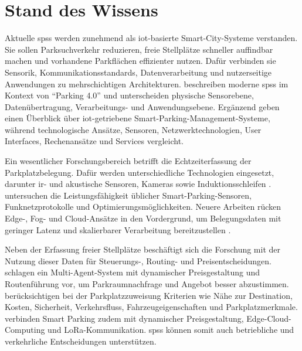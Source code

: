 
\section{Stand des Wissens}\label{sec:related_work}

Aktuelle \acp{sps} werden zunehmend als \ac{iot}-basierte Smart-City-Systeme verstanden. Sie sollen Parksuchverkehr reduzieren, freie Stellplätze schneller auffindbar machen und vorhandene Parkflächen effizienter nutzen. Dafür verbinden sie Sensorik, Kommunikationsstandards, Datenverarbeitung und nutzerseitige Anwendungen zu mehrschichtigen Architekturen. \citet{rajSmartParkingSystems2024} beschreiben moderne \acp{sps} im Kontext von \enquote{Parking 4.0} und unterscheiden physische Sensorebene, Datenübertragung, Verarbeitungs- und Anwendungsebene. Ergänzend geben \citet{alamSurveyIoTDriven2023} einen Überblick über \ac{iot}-getriebene Smart-Parking-Management-Systeme, während \citet{fahimSmartParkingSystems2021} technologische Ansätze, Sensoren, Netzwerktechnologien, User Interfaces, Rechenansätze und Services vergleicht.

Ein wesentlicher Forschungsbereich betrifft die Echtzeiterfassung der Parkplatzbelegung. Dafür werden unterschiedliche Technologien eingesetzt, darunter \ac{ir}- und akustische Sensoren, Kameras sowie Induktionsschleifen \citep{fahimSmartParkingSystems2021}. \citet{perkovicSmartParkingSensors2020} untersuchen die Leistungsfähigkeit üblicher Smart-Parking-Sensoren, Funknetzprotokolle und Optimierungsmöglichkeiten. Neuere Arbeiten rücken Edge-, Fog- und Cloud-Ansätze in den Vordergrund, um Belegungsdaten mit geringer Latenz und skalierbarer Verarbeitung bereitzustellen \citep{alaanzyRealTimeSmart2025,kimRealTimeParkingSpace2025,sarkerSmartParkingSystem2020}. 

Neben der Erfassung freier Stellplätze beschäftigt sich die Forschung mit der Nutzung dieser Daten für Steuerungs-, Routing- und Preisentscheidungen. \citet{hassineDynamicPricingRoute2024} schlagen ein Multi-Agent-System mit dynamischer Preisgestaltung und Routenführung vor, um Parkraumnachfrage und Angebot besser abzustimmen. \citet{icarte-ahumadaMultiAgentSystemParking2025} berücksichtigen bei der Parkplatzzuweisung Kriterien wie Nähe zur Destination, Kosten, Sicherheit, Verkehrsfluss, Fahrzeugeigenschaften und Parkplatzmerkmale. \citet{sarkerSmartParkingSystem2020} verbinden Smart Parking zudem mit dynamischer Preisgestaltung, Edge-Cloud-Computing und LoRa-Kommunikation. \acp{sps} können somit auch betriebliche und verkehrliche Entscheidungen unterstützen.

